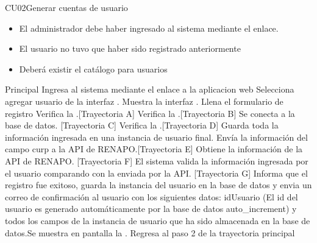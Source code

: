 \begin{UseCase}{CU02}{Generar cuentas de usuario}
{\begin{itemize}
				\item El administrador debe haber ingresado al sistema mediante el 			                 enlace. 
				\item El usuario no tuvo que haber sido registrado anteriormente
				\item Deberá existir el catálogo para usuarios
			\end{itemize}
		}
	\end{UseCase}
	\begin{UCtrayectoria}{Principal}
	\UCpaso[\UCactor] Ingresa al sistema mediante el enlace a la aplicacion web
	 \UCpaso[\UCactor] Selecciona agregar usuario de la interfaz .
	 \UCpaso[\UCsist]Muestra la interfaz .
	  \UCpaso[\UCactor] Llena el formulario de registro
	   \UCpaso[\UCsist] Verifica la  .[Trayectoria A]
	    \UCpaso[\UCsist] Verifica la .[Trayectoria B]
	    \UCpaso[\UCsist] Se conecta a la base de datos. [Trayectoria C]
	    \UCpaso[\UCsist] Verifica la .[Trayectoria D]
	    \UCpaso[\UCsist] Guarda toda la información ingresada en una instancia de usuario final.
	  \UCpaso[\UCsist]Envía la información del campo curp a la API de RENAPO.[Trayectoria E]
	  \UCpaso[\UCsist]Obtiene la información de la API de RENAPO. [Trayectoria F]
	  \UCpaso[\UCsist]El sistema valida la información ingresada por el usuario comparando con la enviada por la API. [Trayectoria G]
	    \UCpaso[\UCsist]Informa que el registro fue exitoso, guarda la instancia del usuario en la base de datos y envia un correo de confirmación al usuario con los siguientes datos: idUsuario (El id del usuario es generado automáticamente por la base de datos auto\_increment) y todos los campos de la instancia de usuario que ha sido almacenada en la base de datos.Se muestra en pantalla la .
	    \UCpaso[\UCsist]Regresa al paso 2 de la trayectoria principal
	\end{UCtrayectoria}
